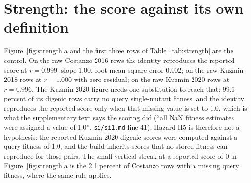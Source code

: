 
\section{Strength: the score against its own definition}
\label{sec:strength}


\begin{table}[htbp]
\centering
\footnotesize
\caption{Recomputed against stored score, by stratum. Within-screen rows recompute
from the columns of one raw source row; every other row recomputes from the build's
stored fitness. ``Measured mean restored'' takes the essentiality 0 back out of each
tainted single by $k/(k-1)$ (Section~\ref{sec:hazards}). The best $r$ is bold.
Generated by \texttt{s3\_closure\_recompute.py}.}
\label{tab:strength}

\end{table}

Figure~\ref{fig:strength}a and the first three rows of Table~\ref{tab:strength} are
the control. On the raw Costanzo 2016 rows the identity reproduces the reported score
at $r = 0.999$, slope 1.00, root-mean-square error 0.002; on the raw Kuzmin 2018 rows
at $r = 1.000$ with zero residual; on the raw Kuzmin 2020 rows at $r = 0.996$. The
Kuzmin 2020 figure needs one substitution to reach that: 99.6 percent of its digenic
rows carry no query single-mutant fitness, and the identity reproduces the reported
score only when that missing value is set to 1.0, which is what the supplementary
text says the scoring did (``all NaN fitness estimates were assigned a value of
1.0'', \texttt{si/si1.md} line 41). Hazard H5 is therefore not a hypothesis: the
reported Kuzmin 2020 digenic scores were computed against a query fitness of 1.0, and
the build inherits scores that no stored fitness can reproduce for those pairs. The
small vertical streak at a reported score of 0 in Figure~\ref{fig:strength}a is the
2.1 percent of Costanzo rows with a missing query fitness, where the same rule
applies.

